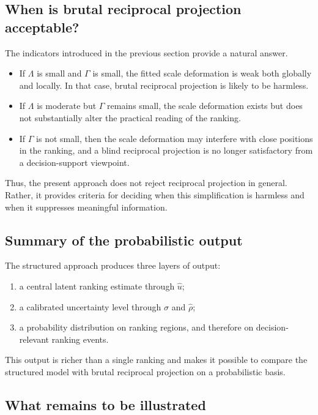 \documentclass[11pt]{amsart}
\theoremstyle{definition}
\theoremstyle{plain}
\numberwithin{equation}{section}
\begin{document}
\subsection{When is brutal reciprocal projection acceptable?}

The indicators introduced in the previous section provide a natural answer.

\begin{itemize}
\item If $\Lambda$ is small and $\Gamma$ is small, the fitted scale deformation is weak both globally and locally. In that case, brutal reciprocal projection is likely to be harmless.
\item If $\Lambda$ is moderate but $\Gamma$ remains small, the scale deformation exists but does not substantially alter the practical reading of the ranking.
\item If $\Gamma$ is not small, then the scale deformation may interfere with close positions in the ranking, and a blind reciprocal projection is no longer satisfactory from a decision-support viewpoint.
\end{itemize}

Thus, the present approach does not reject reciprocal projection in general. Rather, it provides criteria for deciding when this simplification is harmless and when it suppresses meaningful information.

\subsection{Summary of the probabilistic output}

The structured approach produces three layers of output:
\begin{enumerate}[label=\textup{(\arabic*)}]
\item a central latent ranking estimate through $\widehat u$;
\item a calibrated uncertainty level through $\widehat\sigma$ and $\widehat\rho$;
\item a probability distribution on ranking regions, and therefore on decision-relevant ranking events.
\end{enumerate}

This output is richer than a single ranking and makes it possible to compare the structured model with brutal reciprocal projection on a probabilistic basis.


\subsection{What remains to be illustrated}
\end{document}
